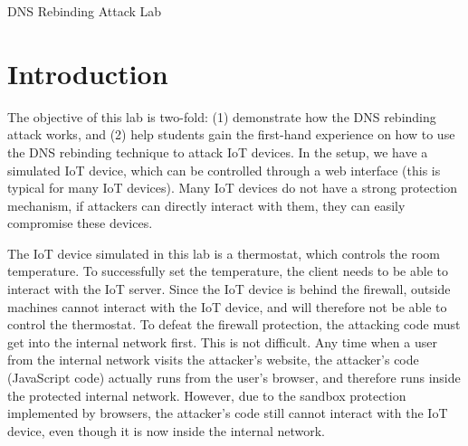 
\newcommand{\commonfolder}{../../common-files}




\newcommand{\rebindingFigs}{./Figs}





\begin{center}
{\LARGE DNS Rebinding Attack Lab}
\end{center}



\setcounter{task}{1}
\newcommand{\tasks} {\bf {\noindent (\arabic{task})} \addtocounter{task}{1} \,}



\section{Introduction}


The objective of this lab is two-fold: (1) demonstrate how 
the DNS rebinding attack works, and (2) help students gain
the first-hand experience on how to use the DNS rebinding
technique to attack IoT devices. In the setup, we have a simulated IoT device, 
which can be controlled through
a web interface (this is typical for many IoT devices). Many IoT devices do not have 
a strong protection mechanism, if attackers can directly interact with them, they can
easily compromise these devices. 


The IoT device simulated in this lab is a thermostat, 
which controls the room temperature. 
To successfully set the temperature, the client needs to be able to interact with the
IoT server. Since the IoT device is behind the firewall, outside machines
cannot interact with the IoT device, and will therefore not be able to 
control the thermostat. To defeat the firewall protection, the attacking code must get into the 
internal network first. This is not difficult. Any time when a user from 
the internal network visits the attacker's website, the attacker's code (JavaScript
code) actually runs from the user's browser, and therefore runs inside the 
protected internal network. However, due to the sandbox protection implemented 
by browsers, the attacker's code still cannot interact with the IoT device, even though it 
is now inside the internal network. 


